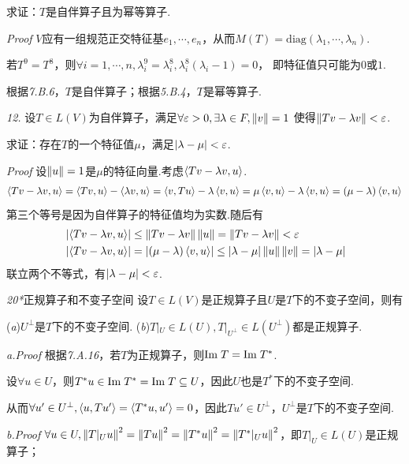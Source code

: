 求证：\(T\)是自伴算子且为幂等算子.

\textit{Proof}
\(V\)应有一组规范正交特征基\(e_1,\cdots,e_n\)，从而\(M(T)=\mathrm{diag}(\lambda_1,\cdots,\lambda_n)\).

若\(T^9=T^8\)，则\(\forall i=1,\cdots,n,\lambda_i^9=\lambda_i^8,\lambda_i^8(\lambda_i-1)=0\)，
即特征值只可能为\(0\)或\(1\).

根据\textit{7.B.6}，\(T\)是自伴算子；根据\textit{5.B.4}，\(T\)是幂等算子.

\hspace*{\fill}

\textit{12.}
设\(T \in L(V)\)为自伴算子，满足\(\forall \varepsilon>0,\exists \lambda \in F,\left\lVert v \right\rVert=1\)
使得\(\left\lVert Tv-\lambda v \right\rVert<\varepsilon\).

求证：存在\(T\)的一个特征值\(\mu\)，满足\(\left\lvert \lambda-\mu \right\rvert<\varepsilon\).

\textit{Proof}
设\(\left\lVert u \right\rVert=1\)是\(\mu\)的特征向量.考虑\(\left\langle Tv-\lambda v,u \right\rangle\).
    \begin{align*}
        \left\langle Tv-\lambda v,u \right\rangle=\left\langle Tv,u \right\rangle-\left\langle \lambda v,u \right\rangle=\left\langle v,Tu \right\rangle-\lambda \left\langle v,u \right\rangle
        =\mu \left\langle v,u \right\rangle-\lambda \left\langle v,u \right\rangle=(\mu-\lambda)\left\langle v,u \right\rangle
    \end{align*}
第三个等号是因为自伴算子的特征值均为实数.随后有
    \begin{align*}
        &\left\lvert \left\langle Tv-\lambda v,u \right\rangle \right\rvert \leq \left\lVert Tv-\lambda v \right\rVert\left\lVert u \right\rVert=\left\lVert Tv-\lambda v \right\rVert<\varepsilon \\
        &\left\lvert \left\langle Tv-\lambda v,u \right\rangle \right\rvert=\left\lvert (\mu-\lambda)\left\langle v,u \right\rangle \right\rvert \leq \left\lvert \lambda-\mu \right\rvert\left\lVert u \right\rVert\left\lVert v \right\rVert=\left\lvert \lambda-\mu \right\rvert
    \end{align*}
联立两个不等式，有\(\left\lvert \lambda-\mu \right\rvert<\varepsilon\).

\newpage

\textit{20*}{\kaishu 正规算子和不变子空间}
设\(T \in L(V)\)是正规算子且\(U\)是\(T\)下的不变子空间，则有

(\textit{a})\(U^\bot\)是\(T\)下的不变子空间. \quad
(\textit{b})\(T|_U \in L(U),T|_{U^\bot} \in L(U^\bot)\)都是正规算子.

\textit{a.Proof}
根据\textit{7.A.16}，若\(T\)为正规算子，则\(\mathrm{Im \;} T=\mathrm{Im \;} T^*\).

设\(\forall u \in U\)，则\(T^*u \in \mathrm{Im \;} T^*=\mathrm{Im \;} T \subseteq U\)，因此\(U\)也是\(T^*\)下的不变子空间.

从而\(\forall u' \in U^\bot,\left\langle u,Tu' \right\rangle=\left\langle T^*u,u' \right\rangle=0\)，因此\(Tu' \in U^\bot\)，\(U^\bot\)是\(T\)下的不变子空间.

\textit{b.Proof}
\(\forall u \in U,\left\lVert T|_U u \right\rVert^2=\left\lVert Tu \right\rVert^2=\left\lVert T^*u \right\rVert^2=\left\lVert T^*|_U u \right\rVert^2\)，即\(T|_U \in L(U)\)是正规算子；


